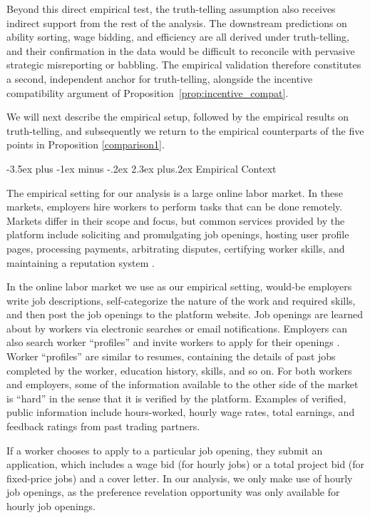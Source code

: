 \documentclass[12pt]{article}
\makeatletter
\renewcommand{\section}{%
  \@startsection{section}{1}{\z@}%
  {-3.5ex plus -1ex minus -.2ex}%
  {2.3ex plus.2ex}%
  {\normalfont\Large\bfseries}%
}
\makeatother
\begin{document}
Beyond this direct empirical test, the truth-telling assumption also receives indirect support from the rest of the analysis. The downstream predictions on ability sorting, wage bidding, and efficiency are all derived under truth-telling, and their confirmation in the data would be difficult to reconcile with pervasive strategic misreporting or babbling. The empirical validation therefore constitutes a second, independent anchor for truth-telling, alongside the incentive compatibility argument of Proposition~\ref{prop:incentive_compat}. 

We will next describe the empirical setup, followed by the empirical results on truth-telling, and subsequently we return to the empirical counterparts of the five points in Proposition \ref{comparison1}.


\section{Empirical Context} \label{sec:empirical_context}

The empirical setting for our analysis is a large online labor market.
In these markets, employers hire workers to perform tasks that can be done remotely.
Markets differ in their scope and focus, but common services provided by the platform include soliciting and promulgating job openings, hosting user profile pages, processing payments, arbitrating disputes, certifying worker skills, and maintaining a reputation system \citep{Horton2010, horton2015reputation}.

In the online labor market we use as our empirical setting, would-be employers write job descriptions, self-categorize the nature of the work and required skills, and then post the job openings to the platform website.
Job openings are learned about by workers via electronic searches or email notifications.
Employers can also search worker ``profiles'' and invite workers to apply for their openings \citep{horton2017effects}.
Worker ``profiles''  are similar to resumes, containing the details of past jobs completed by the worker, education history, skills, and so on.
For both workers and employers, some of the information available to the other side of the market is ``hard'' in the sense that it is verified by the platform.
Examples of verified, public information include hours-worked, hourly wage rates, total earnings, and feedback ratings from past trading partners.

If a worker chooses to apply to a particular job opening, they submit an application, which includes a wage bid (for hourly jobs) or a total project bid (for fixed-price jobs) and a cover letter.
In our analysis, we only make use of hourly job openings, as the preference revelation opportunity was only available for hourly job openings. 
\end{document}

